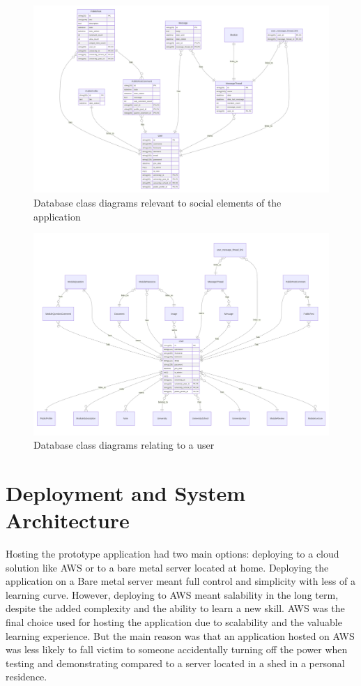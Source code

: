 \begin{figure}[H]
\centering
\includegraphics[scale=0.30]{images/database/db_social.png}
\caption{Database class diagrams relevant to social elements of the application}
\label{fig:figure2}
\end{figure}

\begin{figure}[H]
\centering
\includegraphics[scale=0.30]{images/database/db_user.png}
\caption{Database class diagrams relating to a user}
\label{fig:figure2}
\end{figure}

\section{Deployment and System Architecture}
Hosting the prototype application had two main options: deploying to a cloud solution like AWS or to a bare metal server located at home. Deploying the application on a Bare metal server meant full control and simplicity with less of a learning curve. However, deploying to AWS meant salability in the long term, despite the added complexity and the ability to learn a new skill. AWS was the final choice used for hosting the application due to scalability and the valuable learning experience. But the main reason was that an application hosted on AWS was less likely to fall victim to someone accidentally turning off the power when testing and demonstrating compared to a server located in a shed in a personal residence.


